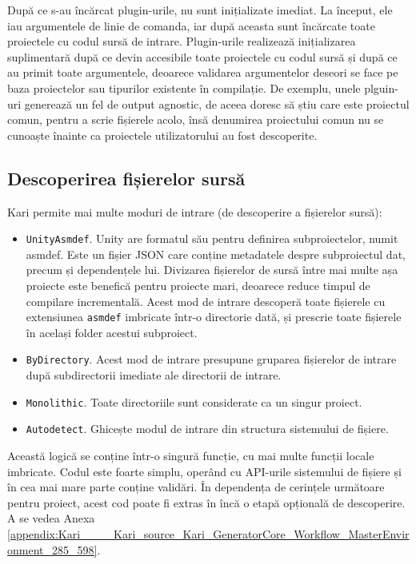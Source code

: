 \documentclass[a4paper,12pt]{report}
\begin{document}
După ce s-au încărcat plugin-urile, nu sunt inițializate imediat.
La început, ele iau argumentele de linie de comanda, iar după aceasta sunt încărcate toate proiectele cu codul sursă de intrare.
Plugin-urile realizează inițializarea suplimentară după ce devin accesibile toate proiectele cu codul sursă și după ce au primit toate argumentele, deoarece validarea argumentelor deseori se face pe baza proiectelor sau tipurilor existente în compilație.
De exemplu, unele plguin-uri generează un fel de output agnostic, de aceea doresc să știu care este proiectul comun, pentru a scrie fișierele acolo, însă denumirea proiectului comun nu se cunoaște înainte ca proiectele utilizatorului au fost descoperite.

\subsection{Descoperirea fișierelor sursă}

Kari permite mai multe moduri de intrare (de descoperire a fișierelor sursă):

\begin{itemize}
  \item \texttt{UnityAsmdef}.
    Unity are formatul său pentru definirea subproiectelor, numit asmdef.
    Este un fișier JSON care conține metadatele despre subproiectul dat, precum și dependențele lui.
    Divizarea fișierelor de sursă între mai multe așa proiecte este benefică pentru proiecte mari, deoarece reduce timpul de compilare incrementală.
    Acest mod de intrare descoperă toate fișierele cu extensiunea \texttt{asmdef} imbricate într-o directorie dată, și prescrie toate fișierele în același folder acestui subproiect.

  \item \texttt{ByDirectory}. Acest mod de intrare presupune gruparea fișierelor de intrare după subdirectorii imediate ale directorii de intrare.

  \item \texttt{Monolithic}. Toate directoriile sunt considerate ca un singur proiect.

  \item \texttt{Autodetect}. Ghicește modul de intrare din structura sistemului de fișiere.
\end{itemize}

Această logică se conține într-o singură funcție, cu mai multe funcții locale imbricate.
Codul este foarte simplu, operând cu \ac{API}-urile sistemului de fișiere și în cea mai mare parte conține validări.
În dependența de cerințele următoare pentru proiect, acest cod poate fi extras în încă o etapă opțională de descoperire.
A se vedea Anexa \ref{appendix:Kari____Kari_source_Kari_GeneratorCore_Workflow_MasterEnvironment_285_598}.
\end{document}
